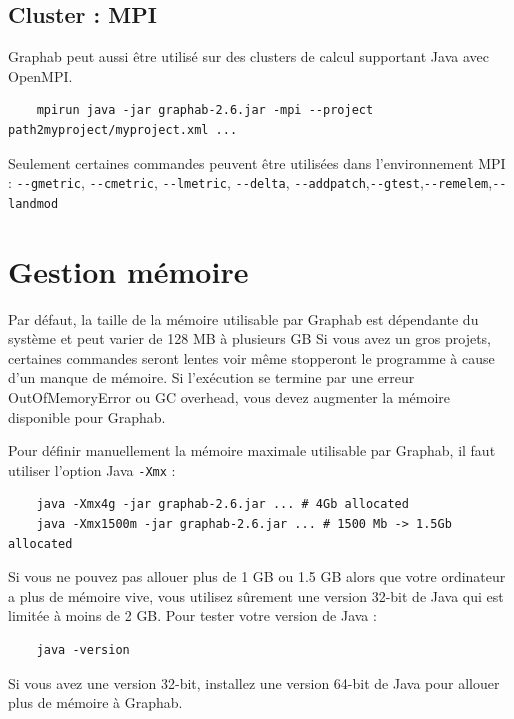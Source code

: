 \documentclass[a4paper,10pt]{report}
\begin{document}
\subsection{Cluster : MPI}
Graphab peut aussi être utilisé sur des clusters de calcul supportant Java avec OpenMPI.
\begin{Verbatim}
	mpirun java -jar graphab-2.6.jar -mpi --project path2myproject/myproject.xml ...
\end{Verbatim}
Seulement certaines commandes peuvent être utilisées dans l'environnement MPI : \verb|--gmetric|, \verb|--cmetric|, \verb|--lmetric|, \verb|--delta|, \verb|--addpatch|,\verb|--gtest|,\verb|--remelem|,\verb|--landmod|

\section{Gestion mémoire}
Par défaut, la taille de la mémoire utilisable par Graphab est dépendante du système et peut varier de 128 MB à plusieurs GB
Si vous avez un gros projets, certaines commandes seront lentes voir même stopperont le programme à cause d'un manque de mémoire.
Si l'exécution se termine par une erreur OutOfMemoryError ou GC overhead, vous devez augmenter la mémoire disponible pour Graphab.

Pour définir manuellement la mémoire maximale utilisable par Graphab, il faut utiliser l'option Java \verb|-Xmx| :
\begin{Verbatim}
	java -Xmx4g -jar graphab-2.6.jar ... # 4Gb allocated
	java -Xmx1500m -jar graphab-2.6.jar ... # 1500 Mb -> 1.5Gb allocated
\end{Verbatim}
Si vous ne pouvez pas allouer plus de 1 GB ou 1.5 GB alors que votre ordinateur a plus de mémoire vive, vous utilisez sûrement une version 32-bit de Java qui est limitée à moins de 2 GB.
Pour tester votre version de Java :
\begin{Verbatim}
	java -version
\end{Verbatim}
Si vous avez une version 32-bit, installez une version 64-bit de Java pour allouer plus de mémoire à Graphab.




\end{document}
